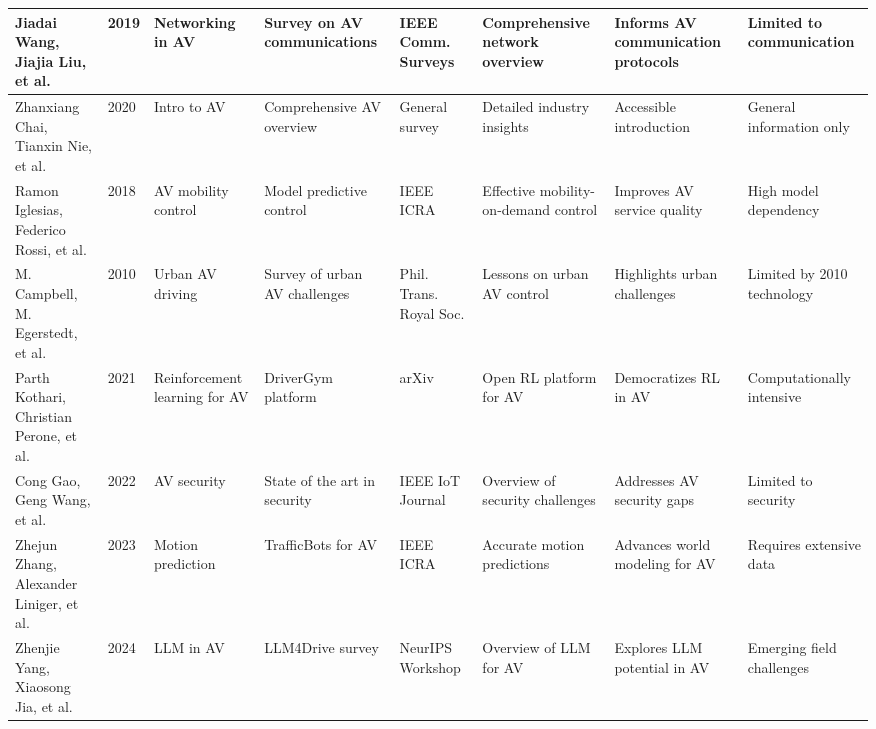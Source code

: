 \documentclass[lettersize,journal]{IEEEtran}
\begin{document}
\begin{longtable}{|p{2cm}|p{1cm}|p{2cm}|p{2cm}|p{2cm}|p{2cm}|p{2cm}|p{2.5cm}|}
\hline
Jiadai Wang, Jiajia Liu, et al. & 2019 & Networking in AV & Survey on AV communications & IEEE Comm. Surveys & Comprehensive network overview & Informs AV communication protocols & Limited to communication \\
\hline
Zhanxiang Chai, Tianxin Nie, et al. & 2020 & Intro to AV & Comprehensive AV overview & General survey & Detailed industry insights & Accessible introduction & General information only \\
\hline
Ramon Iglesias, Federico Rossi, et al. & 2018 & AV mobility control & Model predictive control & IEEE ICRA & Effective mobility-on-demand control & Improves AV service quality & High model dependency \\
\hline
M. Campbell, M. Egerstedt, et al. & 2010 & Urban AV driving & Survey of urban AV challenges & Phil. Trans. Royal Soc. & Lessons on urban AV control & Highlights urban challenges & Limited by 2010 technology \\
\hline
Parth Kothari, Christian Perone, et al. & 2021 & Reinforcement learning for AV & DriverGym platform & arXiv & Open RL platform for AV & Democratizes RL in AV & Computationally intensive \\
\hline
Cong Gao, Geng Wang, et al. & 2022 & AV security & State of the art in security & IEEE IoT Journal & Overview of security challenges & Addresses AV security gaps & Limited to security \\
\hline
Zhejun Zhang, Alexander Liniger, et al. & 2023 & Motion prediction & TrafficBots for AV & IEEE ICRA & Accurate motion predictions & Advances world modeling for AV & Requires extensive data \\
\hline
Zhenjie Yang, Xiaosong Jia, et al. & 2024 & LLM in AV & LLM4Drive survey & NeurIPS Workshop & Overview of LLM for AV & Explores LLM potential in AV & Emerging field challenges \\
\hline


\end{longtable}
\end{document}
